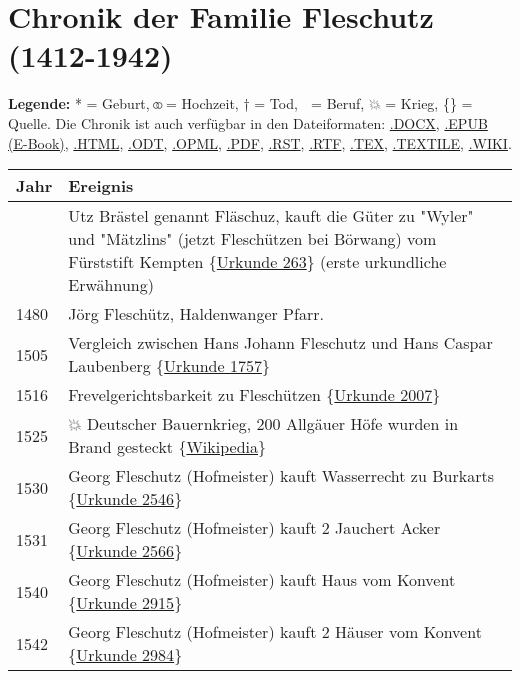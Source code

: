 \documentclass[
]{article}
\author{}
\date{}
\begin{document}
\section{Chronik der Familie Fleschutz (1412-1942)}\label{header-n0}

\textbf{Legende:} * = Geburt, ⚭ = Hochzeit, † = Tod, 🔨 = Beruf, 💥 =
Krieg, \{\} = Quelle. Die Chronik ist auch verfügbar in den
Dateiformaten: \href{Export/Chronik.docx}{.DOCX},
\href{Export/Chronik.epub}{.EPUB (E-Book)},
\href{Export/Chronik.html}{.HTML}, \href{Export/Chronik.odt}{.ODT},
\href{Export/Chronik.opml}{.OPML}, \href{Export/Chronik.pdf}{.PDF},
\href{Export/Chronik.rst}{.RST}, \href{Export/Chronik.rtf}{.RTF},
\href{Export/Chronik.tex}{.TEX},
\href{Export/Chronik.textile}{.TEXTILE},
\href{Export/Chronik.wiki}{.WIKI}.

\begin{longtable}[]{@{}ll@{}}
\toprule\noalign{}
Jahr & Ereignis \\
\midrule\noalign{}
\endhead
\bottomrule\noalign{}
\endlastfoot
1412 & Utz Brästel genannt Fläschuz, kauft die Güter zu "Wyler" und
"Mätzlins" (jetzt Fleschützen bei Börwang) vom Fürststift Kempten
\{\href{Quellen/Fuerststift_Kempten/Urkunde_263/}{Urkunde 263}\} (erste
urkundliche Erwähnung) \\
1480 & Jörg Fleschütz, Haldenwanger Pfarr. \\
1505 & Vergleich zwischen Hans Johann Fleschutz und Hans Caspar
Laubenberg \{\href{Quellen/Fuerststift_Kempten/Urkunde_1757/}{Urkunde
1757}\} \\
1516 & Frevelgerichtsbarkeit zu Fleschützen
\{\href{Quellen/Fuerststift_Kempten/Urkunde_2007/}{Urkunde 2007}\} \\
1525 & 💥 Deutscher Bauernkrieg, 200 Allgäuer Höfe wurden in Brand
gesteckt
\{\href{Quellen/Wikipedia/Deutscher_Bauernkrieg.pdf}{Wikipedia}\} \\
1530 & Georg Fleschutz (Hofmeister) kauft Wasserrecht zu Burkarts
\{\href{Quellen/Fuerststift_Kempten/Urkunde_2546/}{Urkunde 2546}\} \\
1531 & Georg Fleschutz (Hofmeister) kauft 2 Jauchert Acker
\{\href{Quellen/Fuerststift_Kempten/Urkunde_2566/}{Urkunde 2566}\} \\
1540 & Georg Fleschutz (Hofmeister) kauft Haus vom Konvent
\{\href{Quellen/Fuerststift_Kempten/Urkunde_2915/}{Urkunde 2915}\} \\
1542 & Georg Fleschutz (Hofmeister) kauft 2 Häuser vom Konvent
\{\href{Quellen/Fuerststift_Kempten/Urkunde_2984}{Urkunde 2984}\} \\

\end{longtable}
\end{document}
